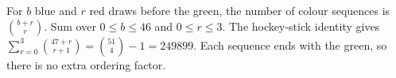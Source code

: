 For $b$ blue and $r$ red draws before the green, the number of colour sequences is $\binom{b+r}r$. Sum over $0\le b\le46$ and $0\le r\le3$. The hockey-stick identity gives $\sum_{r=0}^3\binom{47+r}{r+1}=\binom{51}4-1=\boxed{249899}$. Each sequence ends with the green, so there is no extra ordering factor.
